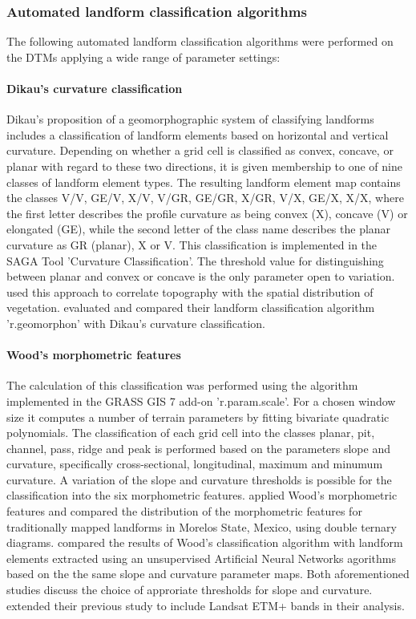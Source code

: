 \documentclass[preprint,12pt,authoryear]{elsarticle}
\begin{document}
\subsubsection{Automated landform classification algorithms}
 The following automated landform classification algorithms were performed on the DTMs applying a wide range of parameter settings:
\paragraph{Dikau's curvature classification \citep{Dikau1988}}
Dikau's proposition of a geomorphographic system of classifying landforms includes a classification of landform elements based on horizontal and vertical curvature. Depending on whether a grid cell is classified as convex, concave, or  planar with regard to these two directions, it is given membership to one of nine classes of landform element types. The resulting landform element map contains the classes V/V, GE/V, X/V, V/GR, GE/GR, X/GR, V/X, GE/X, X/X, where the first letter describes the profile curvature as being convex (X), concave (V) or elongated (GE), while the second letter of the class name describes the planar curvature as GR (planar), X or V. This classification is implemented in the SAGA Tool 'Curvature Classification'. The threshold value for distinguishing between planar and convex or concave is the only parameter open to variation. \cite{Hoersch2002} used this approach to correlate topography with the spatial distribution of vegetation. \cite{Jasiewicz2013} evaluated and compared their landform classification algorithm 'r.geomorphon' with Dikau's curvature classification.
\paragraph{Wood's morphometric features \citep{Wood1996}}
The calculation of this classification was performed using the algorithm implemented in the GRASS GIS 7  add-on 'r.param.scale'.  For a chosen window size it computes a number of terrain parameters by fitting bivariate quadratic polynomials.  The classification of each grid cell into the classes planar, pit, channel, pass, ridge and peak is performed based on the parameters slope and curvature, specifically cross-sectional, longitudinal, maximum and minumum curvature. A variation of  the slope and curvature thresholds is possible for the classification into the six morphometric features.
\cite{Bolongaro-Crevenna2005} applied Wood's morphometric features and compared the distribution of the morphometric features for traditionally mapped landforms in Morelos State, Mexico, using double ternary diagrams. \cite{Ehsani2008} compared the results of Wood's classification algorithm with landform elements extracted using  an unsupervised Artificial Neural Networks agorithms based on the the same slope and curvature parameter maps. Both aforementioned studies discuss the choice of approriate thresholds for slope and curvature. \cite{Ehsani2009} extended their previous study  to include Landsat ETM+ bands in their analysis.  
\end{document}
